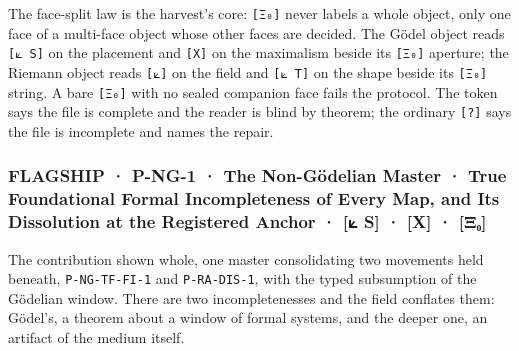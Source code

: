 \documentclass[10pt,twocolumn]{article}
\begin{document}
The face-split law is the harvest's core: \texttt{{[}Ξ₀{]}} never labels
a whole object, only one face of a multi-face object whose other faces
are decided. The Gödel object reads \texttt{{[}⟀\ S{]}} on the placement
and \texttt{{[}X{]}} on the maximalism beside its \texttt{{[}Ξ₀{]}}
aperture; the Riemann object reads \texttt{{[}⟀{]}} on the field and
\texttt{{[}⟀\ T{]}} on the shape beside its \texttt{{[}Ξ₀{]}} string. A
bare \texttt{{[}Ξ₀{]}} with no sealed companion face fails the protocol.
The token says the file is complete and the reader is blind by theorem;
the ordinary \texttt{{[}?{]}} says the file is incomplete and names the
repair.

\hypertarget{flagship-p-ng-1-the-non-guxf6delian-master-true-foundational-formal-incompleteness-of-every-map-and-its-dissolution-at-the-registered-anchor-s-x-ux3beux2080}{%
\subsubsection{FLAGSHIP · P-NG-1 · The Non-Gödelian Master · True
Foundational Formal Incompleteness of Every Map, and Its Dissolution at
the Registered Anchor · {[}⟀ S{]} · {[}X{]} ·
{[}Ξ₀{]}}\label{flagship-p-ng-1-the-non-guxf6delian-master-true-foundational-formal-incompleteness-of-every-map-and-its-dissolution-at-the-registered-anchor-s-x-ux3beux2080}}

The contribution shown whole, one master consolidating two movements
held beneath, \texttt{P-NG-TF-FI-1} and \texttt{P-RA-DIS-1}, with the
typed subsumption of the Gödelian window. There are two incompletenesses
and the field conflates them: Gödel's, a theorem about a window of
formal systems, and the deeper one, an artifact of the medium itself.
\end{document}
